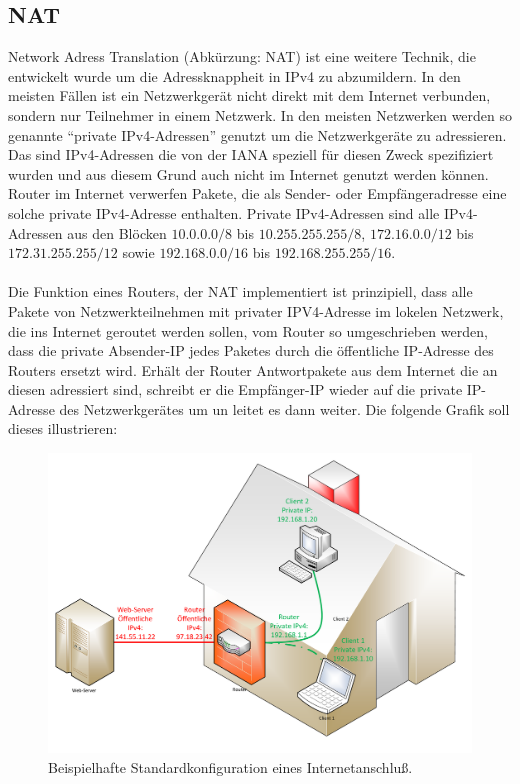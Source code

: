 \documentclass[a4paper,12pt]{scrartcl}
\begin{document}
\subsection{NAT}
Network Adress Translation (Abk\"urzung: NAT) \cite[RFC1631]{RFC1631} ist eine weitere Technik, die entwickelt wurde um die Adressknappheit in IPv4 zu abzumildern. In den meisten F\"allen ist ein Netzwerkger\"at nicht direkt mit dem Internet verbunden, sondern nur Teilnehmer in einem Netzwerk. In den meisten Netzwerken werden so genannte "`private IPv4-Adressen"' genutzt um die Netzwerkger\"ate zu adressieren. Das sind IPv4-Adressen die von der IANA speziell f\"ur diesen Zweck spezifiziert wurden und aus diesem Grund auch nicht im Internet genutzt werden k\"onnen. Router im Internet verwerfen Pakete, die als Sender- oder Empf\"angeradresse eine solche private IPv4-Adresse enthalten. Private IPv4-Adressen sind alle IPv4-Adressen aus den Bl\"ocken $10.0.0.0/8$ bis $10.255.255.255/8$, $172.16.0.0/12$ bis $172.31.255.255/12$ sowie $192.168.0.0/16$ bis $192.168.255.255/16$. \\
\\
Die Funktion eines Routers, der NAT implementiert ist prinzipiell, dass alle Pakete von Netzwerkteilnehmen mit privater IPV4-Adresse im lokelen Netzwerk, die ins Internet geroutet werden sollen, vom Router so umgeschrieben werden, dass die private Absender-IP jedes Paketes durch die \"offentliche IP-Adresse des Routers ersetzt wird. Erh\"alt der Router Antwortpakete aus dem Internet die an diesen adressiert sind, schreibt er die Empf\"anger-IP wieder auf die private IP-Adresse des Netzwerkger\"ates um un leitet es dann weiter. Die folgende Grafik soll dieses illustrieren:

\begin{figure}[htb]
\begin{center}
 \includegraphics[width=1\hsize]{./Zeichnungen/IPv4NAT.pdf}
 \end{center}
\caption[Beispielhafte Standardkonfiguration eines Internetanschlu\ss{} mit NAT, Quelle: Autor, verwendete Symbole unterliegen der
GPL]{\label{stdinet}Beispielhafte Standardkonfiguration eines Internetanschlu\ss{}.}
\end{figure}
\end{document}
